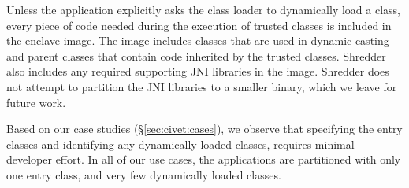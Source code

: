 Unless the application explicitly asks the class loader to
dynamically load a class,
every piece of code needed during the execution of trusted classes
is included in the enclave image.
The image includes classes that are used in dynamic casting and parent classes 
that contain code inherited by the trusted classes.
Shredder also includes any required supporting JNI libraries in the image.
Shredder does not attempt to partition the JNI libraries to a smaller binary,
which we leave for future work.




Based on our case studies (\S\ref{sec:civet:cases}),
we observe that specifying the entry classes and identifying any dynamically loaded classes,
requires minimal developer effort.
In all of our use cases, the applications are partitioned with only one entry class, and very few dynamically loaded classes.




